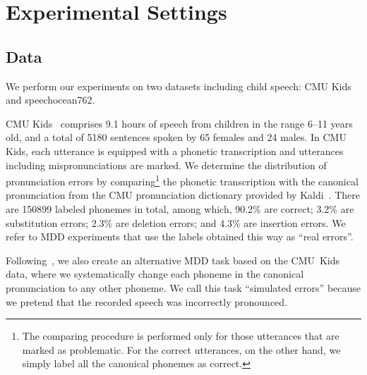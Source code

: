 \section{Experimental Settings}
\label{sec:experiments}
\subsection{Data}
We perform our experiments on two datasets including child speech: CMU Kids and speechocean762.

CMU Kids~\cite{CMU_kids} comprises 9.1 hours of speech from children in the range 6--11 years old, and a total of 5180 sentences spoken by 65 females and 24 males. 
In CMU Kids, each utterance is equipped with a phonetic transcription and utterances including mispronunciations are marked.
We determine the distribution of pronunciation errors by comparing\footnote{The comparing procedure is performed only for those utterances that are marked as problematic.
For the correct utterances, on the other hand, we simply label all the canonical phonemes as correct.}
the phonetic transcription with the canonical pronunciation from the CMU pronunciation dictionary provided by Kaldi~\cite{Povey_ASRU2011}.
There are 150899 labeled phonemes in total, among which, 90.2\% are correct; 3.2\% are substitution errors; 2.3\% are deletion errors; and 4.3\% are insertion errors.
We refer to MDD experiments that use the labels obtained this way as ``real errors''.


Following~\cite{cao23_interspeech}, we also create an alternative MDD task based on the CMU~Kids data, where we systematically change each phoneme in the canonical pronunciation to any other phoneme.
We call this task ``simulated errors'' because we pretend that the recorded speech was incorrectly pronounced.

